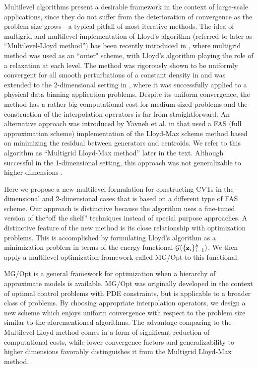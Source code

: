 \documentclass{siamltex}
\begin{document}
Multilevel algorithms present a desirable framework in the context of large-scale applications, since they do not suffer from the deterioration of convergence as the problem size grows---a typical pitfall of most iterative methods. The idea of multigrid and multilevel implementation of Lloyd's algorithm (referred to later as ``Multilevel-Lloyd method'') has been recently introduced in \cite{DE07}, where multigrid method was used as an ``outer" scheme, with Lloyd's algorithm playing the role of a relaxation at each level. The method was rigorously shown to be uniformly convergent for all smooth perturbations of a constant density in \cite{DE08} and was extended to the 2-dimensional setting in \cite{E10}, where it was successfully applied to a physical data binning application problems. Despite its uniform convergence, the method has a rather big computational cost for medium-sized problems and the construction of the interpolation operators is far from straightforward. An alternative approach was introduced by Yavneh et al. %
in \cite{yavneh03} that used a FAS (full approximation scheme) implementation of the Lloyd-Max scheme method based on minimizing the residual between generators and centroids. We refer to this algorithm as ``Multigrid Lloyd-Max method'' later in the text. Although successful in the 1-dimensional setting, this approach was not generalizable to higher dimensions \cite{yavneh06}.

Here we propose a new multilevel formulation for constructing CVTs in  the -dimensional and %
2-dimensional cases that is based on a different type of FAS scheme.  %
Our approach is distinctive because the algorithm uses a fine-tuned version of the``off the shelf'' techniques instead of special purpose approaches. A distinctive feature of the new method is its close relationship with optimization problems.  This is accomplished by formulating Lloyd's algorithm as a minimization problem in terms of the energy functional ${\cg}(\bzin)$. We then apply a multilevel optimization framework called MG/Opt to this functional.

MG/Opt is a general framework for optimization when a hierarchy of approximate models is available.  MG/Opt was originally developed in the context of optimal control problems with PDE constraints, but is applicable to a broader class of problems.  By choosing appropriate interpolation operators, we design a new scheme which enjoys uniform convergence with respect to the problem size similar to the aforementioned algorithms. The advantage comparing to the Multilevel-Lloyd method comes in a form of significant reduction of computational costs, while lower convergence factors and generalizability to higher dimensions favorably distinguishes it from the Multigrid Lloyd-Max method.
\end{document}
